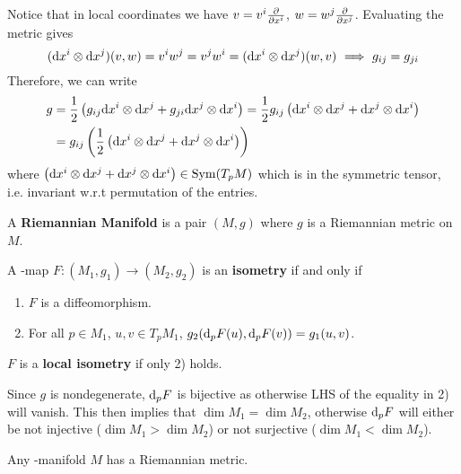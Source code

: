 \documentclass{article}
\begin{document}
\begin{observation}
    Notice that in local coordinates we have $v = v^i \frac{\partial}{\partial x^i}$, $w = w^j \frac{\partial}{\partial x^j}$. Evaluating the metric gives
    \[
        (\mathrm{d} x^i \otimes \mathrm{d} x^j) (v, w) = v^i w^j = v^j w^i = (\mathrm{d} x^i \otimes \mathrm{d} x^j) (w, v) \ \Longrightarrow\  g_{ij} = g_{ji}
    \]
    Therefore, we can write
    \begin{align*}
        g 
        & = \frac{1}{2} \left( g_{ij} \mathrm{d} x^i \otimes \mathrm{d} x^j + g_{ji} \mathrm{d} x^j \otimes \mathrm{d} x^i \right)
        = \frac{1}{2} g_{ij} \left( \mathrm{d} x^i \otimes \mathrm{d} x^j + \mathrm{d} x^j \otimes \mathrm{d} x^i \right) \\
        & = g_{ij} \left( \frac{1}{2} \left( \mathrm{d} x^i \otimes \mathrm{d} x^j + \mathrm{d} x^j \otimes \mathrm{d} x^i \right) \right)
    \end{align*}
    where $\left( \mathrm{d} x^i \otimes \mathrm{d} x^j + \mathrm{d} x^j \otimes \mathrm{d} x^i \right) \in \operatorname{Sym}(T_p M)$ which is in the symmetric tensor, i.e. invariant w.r.t permutation of the entries.  
\end{observation}

\begin{definition}
    A \textbf{Riemannian Manifold} is a pair $(M, g)$ where $g$ is a Riemannian metric on $M$. 
\end{definition}

\begin{definition}[Isometry]
    A \smooth-map $F: (M_1, g_1) \to (M_2, g_2)$ is an \textbf{isometry} if and only if 
    \begin{enumerate}[label=\arabic*)]
        \item $F$ is a diffeomorphism.
        \item For all $p \in M_1$, $u, v \in T_p M_1$, $g_2 (\mathrm{d}_p F(u), \mathrm{d}_p F(v)) = g_1(u, v)$.
    \end{enumerate}
    $F$ is a \textbf{local isometry} if only 2) holds. 
\end{definition}

\begin{remark}
    Since $g$ is nondegenerate, $\mathrm{d}_p F$ is bijective as otherwise LHS of the equality in 2) will vanish. This then implies that $\dim M_1 = \dim M_2$, otherwise $\mathrm{d}_p F$ will either be not injective ($\dim M_1 > \dim M_2$) or not surjective ($\dim M_1 < \dim M_2$).
\end{remark}

\begin{theorem}
    Any \smooth-manifold $M$ has a Riemannian metric.
\end{theorem}
\end{document}
